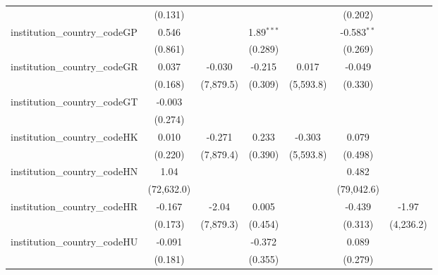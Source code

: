 \begin{tabular}{lcccccc}
                                         & (0.131)        &               &                &               & (0.202)        &   \\   
   institution\_country\_codeGP          & 0.546          &               & 1.89$^{***}$   &               & -0.583$^{**}$  &   \\   
                                         & (0.861)        &               & (0.289)        &               & (0.269)        &   \\   
   institution\_country\_codeGR          & 0.037          & -0.030        & -0.215         & 0.017         & -0.049         &   \\   
                                         & (0.168)        & (7,879.5)     & (0.309)        & (5,593.8)     & (0.330)        &   \\   
   institution\_country\_codeGT          & -0.003         &               &                &               &                &   \\   
                                         & (0.274)        &               &                &               &                &   \\   
   institution\_country\_codeHK          & 0.010          & -0.271        & 0.233          & -0.303        & 0.079          &   \\   
                                         & (0.220)        & (7,879.4)     & (0.390)        & (5,593.8)     & (0.498)        &   \\   
   institution\_country\_codeHN          & 1.04           &               &                &               & 0.482          &   \\   
                                         & (72,632.0)     &               &                &               & (79,042.6)     &   \\   
   institution\_country\_codeHR          & -0.167         & -2.04         & 0.005          &               & -0.439         & -1.97\\   
                                         & (0.173)        & (7,879.3)     & (0.454)        &               & (0.313)        & (4,236.2)\\   
   institution\_country\_codeHU          & -0.091         &               & -0.372         &               & 0.089          &   \\   
                                         & (0.181)        &               & (0.355)        &               & (0.279)        &   \\   

\end{tabular}

